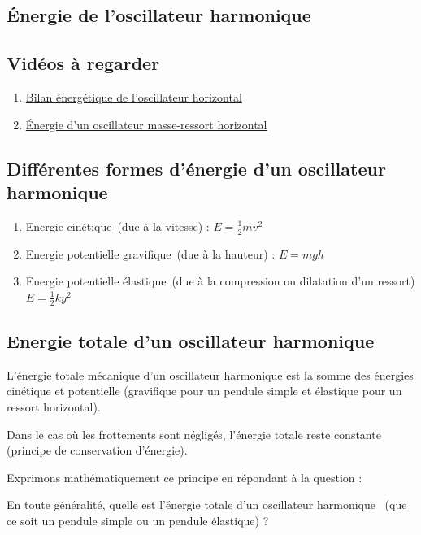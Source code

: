 
\begin{multicols}{2}

\section{Énergie de l’oscillateur harmonique}

\subsection{Vidéos à regarder}
\begin{enumerate}
\item \href{https://videos.domainepublic.net/w/k4SYtXTppaRqy5fQQV3foV}{Bilan énergétique de l'oscillateur horizontal}
\item \href{https://videos.domainepublic.net/w/k19sGJLazDaDXk2Xvz2HpX}{Énergie d'un oscillateur masse-ressort horizontal}
\end{enumerate}

\subsection{Différentes formes d’énergie d’un oscillateur harmonique}
\begin{enumerate}
\item Energie cinétique~(due à la vitesse) :  $E= \frac{1}{2} mv^2$
\item Energie potentielle gravifique~(due à la hauteur) :  $E=mgh$
\item Energie potentielle élastique~(due à la compression ou dilatation d’un ressort) $E=\frac{1}{2} ky^2$ 
\end{enumerate}

\subsection{Energie totale d’un oscillateur harmonique}
L’énergie totale mécanique d’un oscillateur harmonique est la somme des énergies cinétique et potentielle (gravifique
pour un pendule simple et élastique pour un ressort horizontal).

Dans le cas où les frottements sont négligés, l’énergie totale reste constante (principe de conservation d’énergie). 

Exprimons mathématiquement ce principe en répondant à la question : 

En toute généralité, quelle est l’énergie totale d’un oscillateur harmonique~ (que ce soit un pendule simple ou un
pendule élastique) ? 


\end{multicols}
